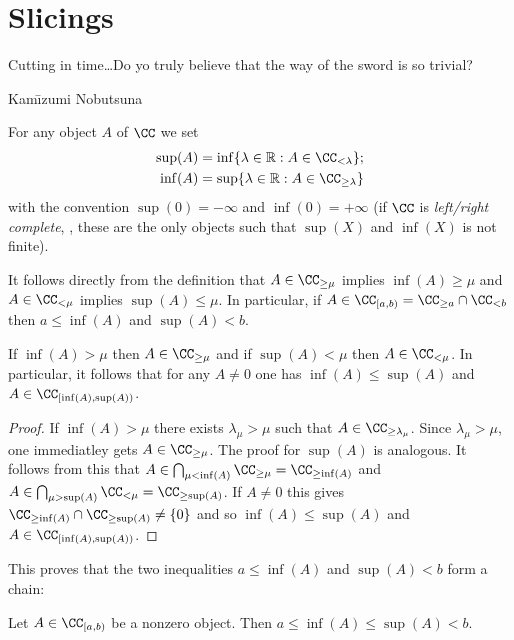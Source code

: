 \section{Slicings}\label{slici}
\epigraph{Cutting in time\dots Do yo truly believe that the way of the sword is so trivial?}{Kam\=\i zumi Nobutsuna}
\begin{definition}\label{sup-n-inf}
For any object $A$ of $\CC$ we set
\begin{align*}
\sup(A) &=\inf\{\lambda\in \R: A\in \CC_{<\lambda}\};\\
\inf(A) &=\sup\{\lambda\in \R: A\in \CC_{\geq\lambda}\}
\end{align*}
with the convention $\sup(0)=-\infty$ and $\inf(0) = +\infty$ (if $\CC$ is \emph{left\fshyp{}right complete}, \cite[ \textbf{1.2.1.19}]{LurieHA}, these are the only objects such that $\sup(X)$ and $\inf(X)$ is not finite).
\end{definition}
\begin{remark}\label{rem.bounds}
It follows directly from the definition that $A\in \CC_{\geq \mu}$ implies $\inf(A)\geq \mu$ and $A\in \CC_{<\mu}$ implies $\sup(A)\leq \mu$. In particular, if $A\in \cab = \CC_{\ge a}\cap \CC_{<b}$ then $a\leq\inf(A)$ and $\sup(A) < b$.
\end{remark}
\begin{lemma}\label{lemma.maggiore.minore}
If $\inf(A)> \mu$ then $A\in \CC_{\geq \mu}$ and if $\sup(A)<\mu$ then $A\in \CC_{<\mu}$. In particular, it follows that for any $A\neq 0$ one has $\inf(A)\leq \sup(A)$ and $A\in \CC_{[\inf(A),\sup(A))}$.
\end{lemma}
\begin{proof}
If $\inf(A)> \mu$ there exists $\lambda_\mu>\mu$ such that $A\in\CC_{\geq \lambda_\mu}$. Since $\lambda_\mu>\mu$, one immediatley gets $A\in\CC_{\geq \mu}$. The proof for $\sup(A)$ is analogous. It follows from this that $A\in \bigcap_{\mu<\inf(A)}\CC_{\geq \mu}=\CC_{\geq \inf(A)}$ and $A\in \bigcap_{\mu>\sup(A)}\CC_{<\mu}=\CC_{\geq \sup(A)}$. If $A\neq 0$ this gives $\CC_{\geq \inf(A)}\cap \CC_{\geq \sup(A)}\neq \{0\}$ and so $\inf(A)\leq \sup(A)$ and $A\in\CC_{[\inf(A),\sup(A))}$. 
\end{proof}
This proves that the two inequalities $a\le \inf(A)$ and $\sup(A) < b$ form a chain:
\begin{corollary}\label{cor.estimates}
Let $A\in \cab$ be a nonzero object. Then $a\leq \inf(A)\leq \sup(A) < b$.
\end{corollary}
